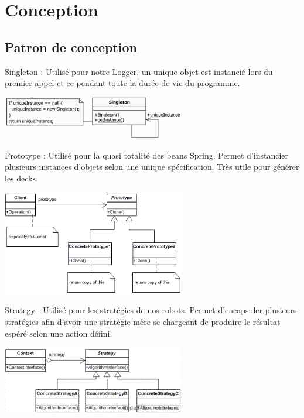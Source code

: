 \chapter{Conception}
\label{conception}

\section{Patron de conception}



Singleton : Utilisé pour notre Logger, un unique objet est instancié lors du premier appel et ce pendant toute la durée de vie du programme.\\
\begin{center}
\includegraphics[width=0.60\textwidth]{./assets/singleton.png}~\\
\end{center}


Prototype : Utilisé pour la quasi totalité des beans Spring. Permet d'instancier plusieurs instances d'objets selon une unique spécification. Très utile pour générer les decks.\\
\begin{center}
\includegraphics[width=0.60\textwidth]{./assets/prototype.png}~\\
\end{center}


Strategy : Utilisé pour les stratégies de nos robots. Permet d'encapsuler plusieurs stratégies afin d'avoir une stratégie mère se chargeant de produire le résultat espéré selon une action défini.\\
\begin{center}
\includegraphics[width=0.60\textwidth]{./assets/strategie.png}
\end{center}
